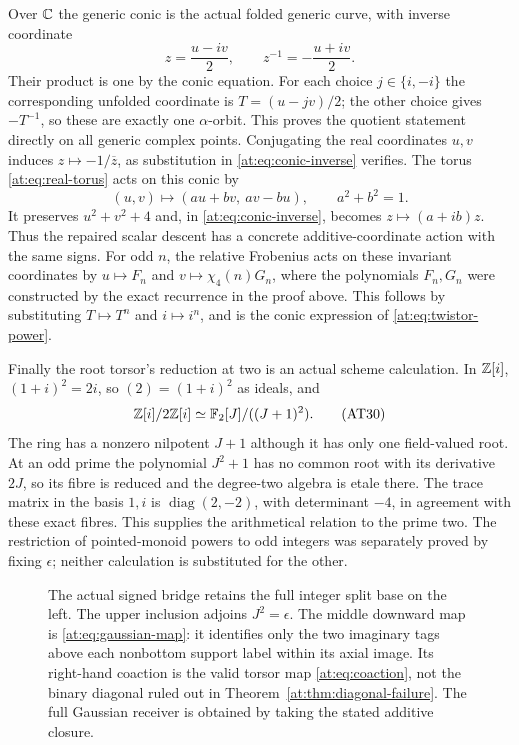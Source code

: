 Over $\mathbb C$ the generic conic is the actual folded generic curve,
with inverse coordinate
\[
 z=\frac{u-iv}{2},\qquad z^{-1}=-\frac{u+iv}{2}.
 \tag{AT29a}\label{at:eq:conic-inverse}
\]
Their product is one by the conic equation. For each choice
$j\in\{i,-i\}$ the corresponding unfolded coordinate is
$T=(u-jv)/2$; the other choice gives $-T^{-1}$, so these are
exactly one $\alpha$-orbit. This proves the quotient statement
directly on all generic complex points. Conjugating the real
coordinates $u,v$ induces $z\mapsto-1/\overline z$, as
substitution in \eqref{at:eq:conic-inverse} verifies.
The torus \eqref{at:eq:real-torus} acts on this conic by
\[
 (u,v)\longmapsto(au+bv,\ av-bu),\qquad a^2+b^2=1.
 \tag{AT29b}\label{at:eq:conic-action}
\]
It preserves $u^2+v^2+4$ and, in \eqref{at:eq:conic-inverse},
becomes $z\mapsto(a+ib)z$. Thus the repaired scalar descent
has a concrete additive-coordinate action with the same signs.
For odd $n$, the relative Frobenius acts on these invariant
coordinates by $u\mapsto F_n$ and
$v\mapsto\chi_4(n)G_n$, where the polynomials $F_n,G_n$
were constructed by the exact recurrence in the proof above.
This follows by substituting $T\mapsto T^n$ and $i\mapsto i^n$,
and is the conic expression of \eqref{at:eq:twistor-power}.

Finally the root torsor's reduction at two is an actual scheme
calculation. In $\mathbb Z[i]$,
$(1+i)^2=2i$, so $(2)=(1+i)^2$ as ideals, and
\[
 \mathbb Z[i]/2\mathbb Z[i]\simeq\mathbb F_2[J]/((J+1)^2).
 \tag{AT30}\label{at:eq:two-fibre}
\]
The ring has a nonzero nilpotent $J+1$ although it has only one
field-valued root. At an odd prime the polynomial $J^2+1$ has
no common root with its derivative $2J$, so its fibre is reduced
and the degree-two algebra is etale there. The trace matrix in
the basis $1,i$ is $\operatorname{diag}(2,-2)$, with determinant
$-4$, in agreement with these exact fibres. This supplies the
arithmetical relation to the prime two. The restriction of
pointed-monoid powers to odd integers was separately proved by
fixing $\epsilon$; neither calculation is substituted for the
other.

\begin{figure}[ht]
\centering
{}
\caption{The actual signed bridge retains the full integer split
base on the left. The upper inclusion adjoins $J^2=\epsilon$.
The middle downward map is \eqref{at:eq:gaussian-map}: it identifies
only the two imaginary tags above each nonbottom support label
within its axial image. Its right-hand coaction is the valid
torsor map \eqref{at:eq:coaction}, not the binary diagonal ruled
out in Theorem~\ref{at:thm:diagonal-failure}. The full Gaussian
receiver is obtained by taking the stated additive closure.}
\end{figure}

